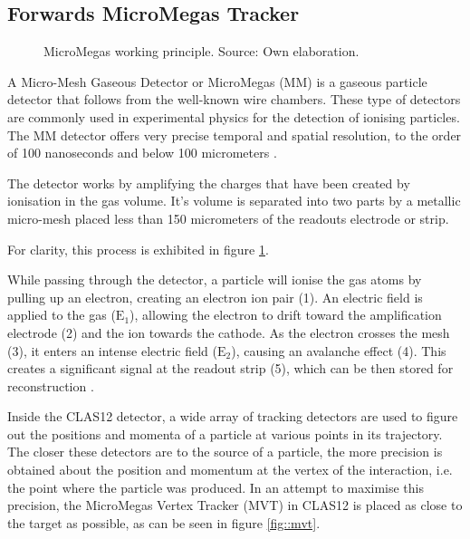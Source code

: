\subsection{Forwards MicroMegas Tracker}
\label{ssec::forwards_micromegas_tracker}
    \begin{figure}[b!]
        \centering{}
        \caption[MM working principle.]{MicroMegas working principle.
        Source: Own elaboration.}
        \label{fig::mm_principle}
    \end{figure}

    A Micro-Mesh Gaseous Detector or MicroMegas (MM) is a gaseous particle detector that follows from the well-known wire chambers.
    These type of detectors are commonly used in experimental physics for the detection of ionising particles.
    The MM detector offers very precise temporal and spatial resolution, to the order of 100 nanoseconds and below 100 micrometers \cite{giomataris1996}.

    The detector works by amplifying the charges that have been created by ionisation in the gas volume.
    It's volume is separated into two parts by a metallic micro-mesh placed less than 150 micrometers of the readouts electrode or strip.

    For clarity, this process is exhibited in figure \ref{fig::mm_principle}.

    While passing through the detector, a particle will ionise the gas atoms by pulling up an electron, creating an electron ion pair (1).
    An electric field is applied to the gas ($\text{E}_1$), allowing the electron to drift toward the amplification electrode (2) and the ion towards the cathode.
    As the electron crosses the mesh (3), it enters an intense electric field ($\text{E}_2$), causing an avalanche effect (4).
    This creates a significant signal at the readout strip (5), which can be then stored for reconstruction \cite{giomataris1996}.

    Inside the CLAS12 detector, a wide array of tracking detectors are used to figure out the positions and momenta of a particle at various points in its trajectory.
    The closer these detectors are to the source of a particle, the more precision is obtained about the position and momentum at the vertex of the interaction, i.e. the point where the particle was produced.
    In an attempt to maximise this precision, the MicroMegas Vertex Tracker (MVT) in CLAS12 is placed as close to the target as possible, as can be seen in figure \ref{fig::mvt}.

